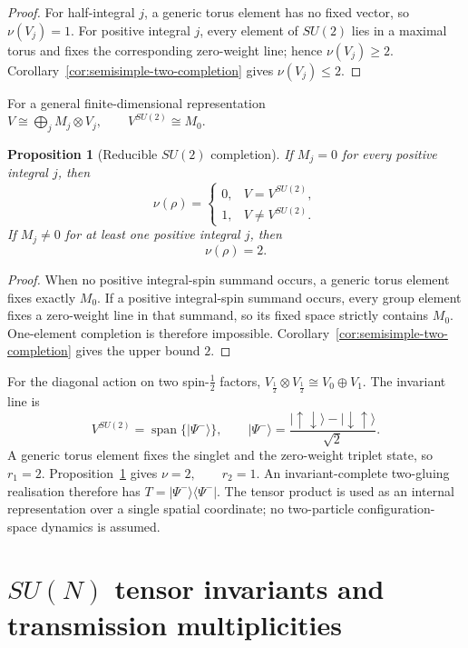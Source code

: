 \documentclass[11pt]{article}
\theoremstyle{plain}
\newtheorem{proposition}[theorem]{Proposition}
\theoremstyle{definition}
\begin{document}
\begin{proof}
For half-integral \(j\), a generic torus element has no fixed vector, so \(\nu(V_j)=1\). For positive integral \(j\), every element of \(SU(2)\) lies in a maximal torus and fixes the corresponding zero-weight line; hence \(\nu(V_j)\geq2\). Corollary~\ref{cor:semisimple-two-completion} gives \(\nu(V_j)\leq2\).
\end{proof}

For a general finite-dimensional representation
\(V\cong\bigoplus_j M_j\otimes V_j, \qquad V^{SU(2)}\cong M_0\).

\begin{proposition}[Reducible \texorpdfstring{\(SU(2)\)}{SU(2)} completion]
\label{prop:SU2-reducible-completion}
If \(M_j=0\) for every positive integral \(j\), then
\[
\nu(\rho)=
\begin{cases}
0,&V=V^{SU(2)},\\
1,&V\neq V^{SU(2)}.
\end{cases}
\]
If \(M_j\neq0\) for at least one positive integral \(j\), then
\[
\nu(\rho)=2.
\]
\end{proposition}

\begin{proof}
When no positive integral-spin summand occurs, a generic torus element fixes exactly \(M_0\). If a positive integral-spin summand occurs, every group element fixes a zero-weight line in that summand, so its fixed space strictly contains \(M_0\). One-element completion is therefore impossible. Corollary~\ref{cor:semisimple-two-completion} gives the upper bound \(2\).
\end{proof}

For the diagonal action on two spin-\(\frac12\) factors,
\(V_{\frac12}\otimes V_{\frac12} \cong V_0\oplus V_1\).
The invariant line is
\[
V^{SU(2)}
=
\operatorname{span}\{|\Psi^-\rangle\},
\qquad
|\Psi^-\rangle
=
\frac{|\uparrow\downarrow\rangle-|\downarrow\uparrow\rangle}{\sqrt2}.
\]
A generic torus element fixes the singlet and the zero-weight triplet state, so
\(r_1=2\).
Proposition~\ref{prop:SU2-reducible-completion} gives
\(\nu=2, \qquad r_2=1\).
An invariant-complete two-gluing realisation therefore has
\(T=|\Psi^-\rangle\langle\Psi^-|\).
The tensor product is used as an internal representation over a single spatial coordinate; no two-particle configuration-space dynamics is assumed.
\section{\texorpdfstring{\(SU(N)\)}{SU(N)} tensor invariants and transmission multiplicities}
\label{sec:SUN-tensors}
\end{document}
